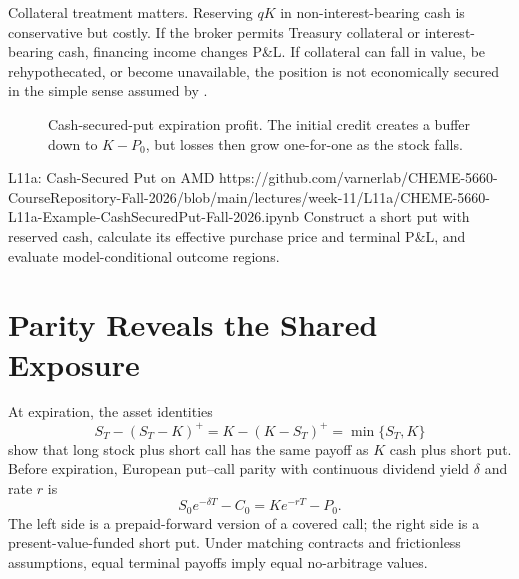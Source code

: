 \documentclass[11pt]{article}
\begin{document}
Collateral treatment matters. Reserving $qK$ in non-interest-bearing cash is conservative but costly. If the broker permits Treasury collateral or interest-bearing cash, financing income changes P\&L. If collateral can fall in value, be rehypothecated, or become unavailable, the position is not economically secured in the simple sense assumed by .

\begin{figure}[ht]
  \centering
  \caption{Cash-secured-put expiration profit. The initial credit creates a buffer down to $K-P_0$, but losses then grow one-for-one as the stock falls.}
  \label{fig:csp}
\end{figure}

\notebooklink
  {L11a: Cash-Secured Put on AMD}
  {https://github.com/varnerlab/CHEME-5660-CourseRepository-Fall-2026/blob/main/lectures/week-11/L11a/CHEME-5660-L11a-Example-CashSecuredPut-Fall-2026.ipynb}
  {Construct a short put with reserved cash, calculate its effective purchase price and terminal P\&L, and evaluate model-conditional outcome regions.}

\section{Parity Reveals the Shared Exposure}

At expiration, the asset identities
\begin{equation}
  \label{eq:terminal-parity}
  S_T-(S_T-K)^+
  =K-(K-S_T)^+
  =\min\{S_T,K\}
\end{equation}
show that long stock plus short call has the same payoff as $K$ cash plus short put. Before expiration, European put--call parity with continuous dividend yield $\delta$ and rate $r$ is
\begin{equation}
  \label{eq:put-call-parity}
  S_0e^{-\delta T}-C_0=Ke^{-rT}-P_0.
\end{equation}
The left side is a prepaid-forward version of a covered call; the right side is a present-value-funded short put. Under matching contracts and frictionless assumptions, equal terminal payoffs imply equal no-arbitrage values.
\end{document}

